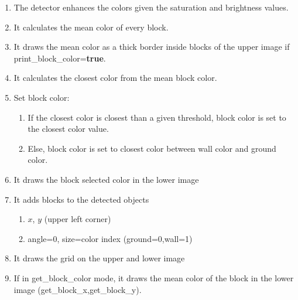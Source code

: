     \begin{enumerate}
        \item The detector enhances the colors given the saturation and 
            brightness values.
        \item It calculates the mean color of every block.
        \item It draws the mean color as a thick border inside blocks of 
            the upper image if print\_block\_color={\bf true}.
        \item It calculates the closest color from the mean block color.
        \item Set block color:
        \begin{enumerate}
            \item If the closest color is closest than a given threshold, 
                block color is set to the closest color value.
            \item Else, block color is set to closest color between 
                wall color and ground color.
        \end{enumerate}
        \item It draws the block selected color in the lower image 
        \item It adds blocks to the detected objects
        \begin{enumerate}
            \item $x$, $y$ (upper left corner)
            \item angle=0, size=color index (ground=0,wall=1)
        \end{enumerate}
        \item It draws the grid on the upper and lower image
        \item If in get\_block\_color mode, it draws the mean color of 
            the block in the lower image (get\_block\_x,get\_block\_y).
 
    \end{enumerate}


